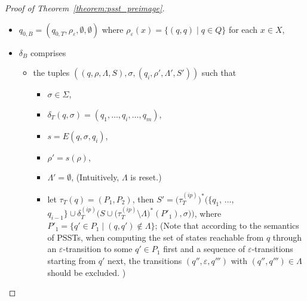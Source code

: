 \begin{proof}[Proof of Theorem~\ref{theorem:psst_preimage}]
\begin{itemize}
\item $q_{0, B} = (q_{0,T}, \rho_{\varepsilon}, \emptyset, \emptyset)$ where $\rho_{\varepsilon} (x) = \{(q, q) \mid q \in Q\}$ for each $x \in X$,

\item $\delta_{B}$ comprises 
\begin{itemize}
%
\item the tuples $((q, \rho, \Lambda, S), \sigma, (q_i, \rho', \Lambda', S'))$ such that  
\begin{itemize}
\item $\sigma \in \Sigma$, 
%
\item $\delta_T (q, \sigma) = (q_1, \ldots, q_i, \ldots, q_m)$, 
%
\item $s = E(q, \sigma, q_i)$, 
%
\item $\rho' = s(\rho)$,
%
\item $\Lambda' = \emptyset$, (Intuitively, $\Lambda$ is reset.)
%
\item let $\tau_T(q) = (P_1, P_2)$, then $S' = \big(\tau^{(ip)}_T\big)^\ast\big(\{ q_1$, $\ldots$, $q_{i - 1} \} \cup \delta^{(ip)}_T\big(S \cup \big(\tau^{(ip)}_T \setminus \Lambda\big)^\ast(P'_1), \sigma\big)\big)$, where $P'_1 = \{q' \in P_1 \mid (q, q') \not \in \Lambda\}$;  (Note that according to the semantics of PSSTs, when computing the set of states reachable from $q$ through an $\varepsilon$-transition to some $q' \in P_1$ first and a sequence of $\varepsilon$-transitions starting from $q'$ next, the transitions $(q'', \varepsilon, q''')$ with $(q'', q''') \in \Lambda$ should be excluded. )
%

\end{itemize}
\end{itemize}
\end{itemize}
\end{proof}
